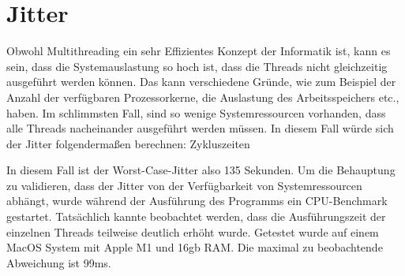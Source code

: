 \chapter{Jitter}
\label{cha:Worst Case Jitter}

Obwohl Multithreading ein sehr Effizientes Konzept der Informatik ist, kann es sein, dass die Systemauslastung so hoch ist, dass die Threads nicht gleichzeitig ausgeführt werden können. Das kann verschiedene Gründe, wie zum Beispiel der Anzahl der verfügbaren Prozessorkerne, die Auslastung des Arbeitsspeichers etc., haben. Im schlimmsten Fall, sind so wenige Systemressourcen vorhanden, dass alle Threads nacheinander ausgeführt werden müssen. In diesem Fall würde sich der Jitter folgendermaßen berechnen: \newline\newline
\sum Zykluszeiten
\par
In diesem Fall ist der Worst-Case-Jitter also 135 Sekunden. 
Um die Behauptung zu validieren, dass der Jitter von der Verfügbarkeit von Systemressourcen abhängt, wurde während der Ausführung des Programms ein CPU-Benchmark gestartet. Tatsächlich kannte beobachtet werden, dass die Ausführungszeit der einzelnen Threads teilweise deutlich erhöht wurde. 
Getestet wurde auf einem MacOS System mit Apple M1 und 16gb RAM. Die maximal zu beobachtende Abweichung ist 99ms. 

